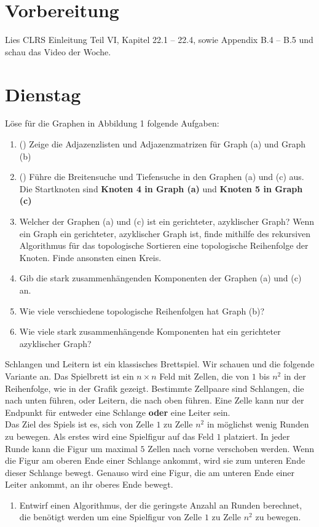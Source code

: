 \documentclass{uebung_cs}
\begin{document}
\section*{Vorbereitung}
Lies CLRS Einleitung Teil VI, Kapitel 22.1 -- 22.4, sowie Appendix B.4 -- B.5 und schau das Video der Woche.

\section*{Dienstag}

\begin{aufgabe}
Löse für die Graphen in Abbildung 1 folgende Aufgaben:
	\begin{enumerate}
		\item (\warmup) Zeige die Adjazenzlisten und Adjazenzmatrizen für Graph (a) und Graph (b)
		\item (\warmup) Führe die Breitensuche und Tiefensuche in den Graphen (a) und (c) aus.
		Die Startknoten sind \textbf{Knoten 4 in Graph (a)} und \textbf{Knoten 5 in Graph (c)}
		\item Welcher der Graphen (a) und (c) ist ein gerichteter, azyklischer Graph?
		Wenn ein Graph ein gerichteter, azyklischer Graph ist, finde mithilfe des rekursiven Algorithmus für das topologische Sortieren eine topologische Reihenfolge der Knoten.
		Finde ansonsten einen Kreis.
		\item Gib die stark zusammenhängenden Komponenten der Graphen (a) und (c) an.
		\item Wie viele verschiedene topologische Reihenfolgen hat Graph (b)?
		\item Wie viele stark zusammenhängende Komponenten hat ein gerichteter azyklischer Graph?
	\end{enumerate}
\end{aufgabe}

\begin{aufgabe}
	Schlangen und Leitern ist ein klassisches Brettspiel.
	Wir schauen und die folgende Variante an.
	Das Spielbrett ist ein $n \times n$ Feld mit Zellen, die von $1$ bis $n^2$ in der Reihenfolge, wie in der Grafik gezeigt.
	Bestimmte Zellpaare sind Schlangen, die nach unten führen, oder Leitern, die nach oben führen.
	Eine Zelle kann nur der Endpunkt für entweder eine Schlange \textbf{oder} eine Leiter sein.\\
	Das Ziel des Spiels ist es, sich von Zelle $1$ zu Zelle $n^2$ in möglichst wenig Runden zu bewegen.
	Als erstes wird eine Spielfigur auf das Feld $1$ platziert.
	In jeder Runde kann die Figur um maximal $5$ Zellen nach vorne verschoben werden.
	Wenn die Figur am oberen Ende einer Schlange ankommt, wird sie zum unteren Ende dieser Schlange bewegt.
	Genauso wird eine Figur, die am unteren Ende einer Leiter ankommt, an ihr oberes Ende bewegt.
	\begin{enumerate}
		\item Entwirf einen Algorithmus, der die geringste Anzahl an Runden berechnet, die benötigt werden um eine Spielfigur von Zelle $1$ zu Zelle $n^2$ zu bewegen.
	\end{enumerate}    
\end{aufgabe}
\end{document}
